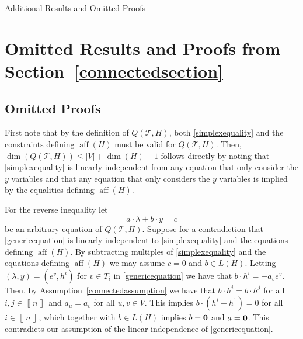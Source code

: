 \documentclass[mnsc]{informs3}
\newcommand{\abs}[1]{\left|#1\right|}                       %
\newcommand{\bra}[1]{\left(#1\right)}
\newcommand{\sidx}[1]{\left\llbracket     #1 \right\rrbracket}
\DeclareMathOperator{\aff}{aff}
\begin{document}







\begin{APPENDIX}{Additional Results and Omitted Proofs}



\section{Omitted Results and Proofs from Section~\ref{connectedsection}}

\subsection{Omitted Proofs}\label{appendixproofconnectedsection}

\lambdaaffLemma*
{}
First note that by the definition of $Q\bra{\mathcal{T},H}$, both \eqref{simplexequality} and the constraints defining $\aff\bra{H}$ must be valid for $Q\bra{\mathcal{T},H}$.
Then, $\dim\bra{Q\bra{\mathcal{T},H}}\leq \abs{V}+\dim\bra{H}-1$ follows directly by noting that \eqref{simplexequality} is linearly independent from any equation that only consider the $y$ variables and that any equation that only considers the $y$ variables is implied by the equalities defining $\aff\bra{H}$.

For the reverse inequality let 
\begin{equation}\label{genericequation}
a\cdot \lambda +b\cdot y  =c
\end{equation}
be an arbitrary equation of $Q\bra{\mathcal{T},H}$. Suppose for a contradiction  that \eqref{genericequation} is linearly independent to \eqref{simplexequality} and the equations defining $\aff\bra{H}$. 
By subtracting multiples of \eqref{simplexequality} and the equations defining $\aff\bra{H}$ we may assume $c=0$ and $b\in L\bra{H}$. Letting $\bra{\lambda,y}=\bra{e^v,h^i}$ for $v\in T_i$ in \eqref{genericequation} we have that $b\cdot h^i=-a_v e^v$. Then, by Assumption~\ref{connectedassumption} we have that $b\cdot h^i=b\cdot h^j$ for all $i,j\in \sidx{n}$ and $a_u=a_{v}$ for all $u,v\in V$. This implies $b\cdot\bra{h^i-h^1}=0$ for all $i\in\sidx{n}$, which together with $b\in L\bra{H}$ implies $b=\bf 0$ and $a=\bf 0$. This contradicts our assumption of the linear independence of \eqref{genericequation}.
\Halmos\endproof




\end{APPENDIX}
\end{document}
